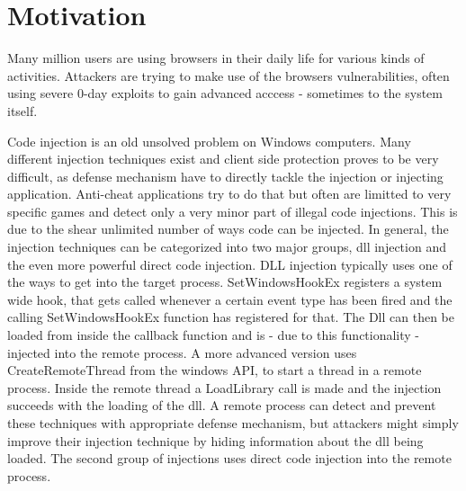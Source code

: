 \section{Motivation}

Many million users are using browsers in their daily life for various kinds of activities. Attackers are trying to make use of the browsers vulnerabilities, often using severe 0-day exploits to gain advanced acccess - sometimes to the system itself.

Code injection is an old unsolved problem on Windows computers. Many different injection techniques exist and client side protection proves to be very difficult, as defense mechanism have to directly tackle the injection or injecting application. Anti-cheat applications try to do that but often are limitted to very specific games and detect only a very minor part of illegal code injections. This is due to the shear unlimited number of ways code can be injected. In general, the injection techniques can be categorized into two major groups, dll injection and the even more powerful direct code injection. DLL injection typically uses one of the ways to get into the target process. SetWindowsHookEx registers a system wide hook, that gets called whenever a certain event type has been fired and the calling SetWindowsHookEx function has registered for that. The Dll can then be loaded from inside the callback function and is - due to this functionality - injected into the remote process. A more advanced version uses CreateRemoteThread from the windows API, to start a thread in a remote process. Inside the remote thread a LoadLibrary call is made and the injection succeeds with the loading of the dll. A remote process can detect and prevent these techniques with appropriate defense mechanism, but attackers might simply improve their injection technique by hiding information about the dll being loaded. The second group of injections uses direct code injection into the remote process. 